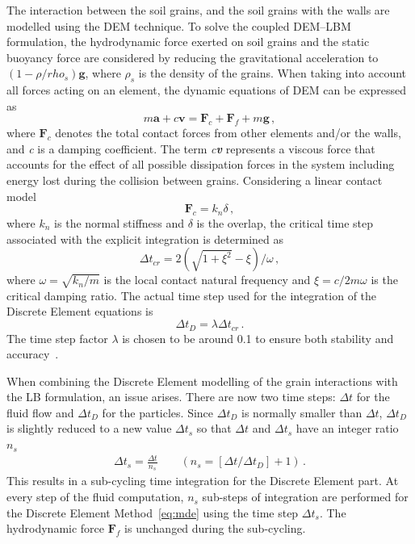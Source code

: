 The interaction between the soil grains, and the soil grains with the walls are 
modelled using the DEM technique. To solve the coupled DEM--LBM formulation, 
the 
hydrodynamic force exerted on soil grains and the static buoyancy force are 
considered by reducing the gravitational acceleration to $(1- 
\rho/rho_{s})\mathbf{g}$, where $\rho_{s}$ is the density of the grains. When 
taking into account all forces acting on an element, the dynamic equations of 
DEM can be expressed as
%
\begin{equation}
\label{eq:mde}
\mathit{m}\mathbf{a} +\mathit{c}\mathbf{v} = \mathbf{F}_{c} + \mathbf{F}_{f} 
+\mathit{m}\mathbf{g} \,,
\end{equation} 
%
\noindent where $\mathbf{F}_{c}$ denotes the total contact forces from other 
elements and/or the walls, and \textit{c} is a damping coefficient. The term 
\textit{c\textbf{v}} represents a viscous force that accounts for the effect of 
all possible dissipation forces in the system including energy lost during the 
collision between grains. Considering a linear contact model
%
\begin{equation}
\mathbf{F}_{c}=\mathit{k}_{\mathit{n}} \delta \,,
\end{equation}
%
\noindent where $\mathit{k}_{\mathit{n}}$ is the normal stiffness and $\delta$ 
is the overlap, the critical time step associated with the explicit integration 
is determined as~\citep{He1997}
%
\begin{equation}
\Delta t_{\mathit{cr}}= 2(\sqrt{1 + \xi^{2}}-\xi) / \omega \,,
\end{equation}
%
\noindent where $\omega = \sqrt{\mathit{k}_{\mathit{n}}/\mathit{m}}$ is the 
local contact natural frequency and $\xi = \mathit{c}/2\mathit{m}\omega$ is the 
critical damping ratio. The actual time step used for the integration of the 
Discrete Element equations is
%
\begin{equation}
\Delta \mathit{t}_{D}=\lambda \Delta \mathit{t}_{cr} \,.
\end{equation}
%
The time step factor $\lambda$ is chosen to be around 0.1 to ensure both 
stability and accuracy~\citep{He1997}.

When combining the Discrete Element modelling of the grain interactions with 
the LB formulation, an issue arises. There are now two time steps: $\Delta t$ 
for the fluid flow and $\Delta t_{D}$ for the particles. Since $\Delta t_{D}$ 
is normally smaller than $\Delta t$, $\Delta t_{D}$ is slightly reduced to a 
new value $\Delta t_{s}$ so that $\Delta t$ and $\Delta t_{s}$ have an integer 
ratio $\mathit{n}_{\mathit{s}}$
%
\begin{align}
\Delta t_{s}=\frac{\Delta t}{\mathit{n}_{s}} \qquad(\mathit{n}_{s}=[\Delta t/ 
\Delta t_{D}]+1) \,.
\end{align} 
%
This results in a sub-cycling time integration for the Discrete 
Element part. At every step of the fluid computation, $\mathit{n}_{s}$ 
sub-steps of integration are performed for the Discrete Element 
Method~\eqref{eq:mde} using the time step $\Delta t_{s}$. The hydrodynamic 
force $\mathbf{F}_{f}$ is unchanged during the sub-cycling. 

